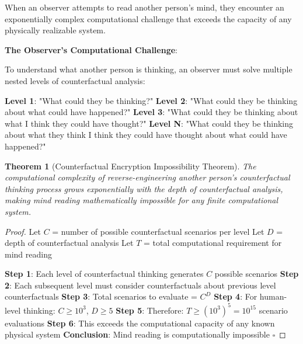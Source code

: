 \documentclass[12pt,a4paper]{article}
\newtheorem{theorem}{Theorem}[section]
\begin{document}
When an observer attempts to read another person's mind, they encounter an exponentially complex computational challenge that exceeds the capacity of any physically realizable system.

\textbf{The Observer's Computational Challenge}:

To understand what another person is thinking, an observer must solve multiple nested levels of counterfactual analysis:

\textbf{Level 1}: "What could they be thinking?"
\textbf{Level 2}: "What could they be thinking about what could have happened?"
\textbf{Level 3}: "What could they be thinking about what I think they could have thought?"
\textbf{Level N}: "What could they be thinking about what they think I think they could have thought about what could have happened?"

\begin{theorem}[Counterfactual Encryption Impossibility Theorem]
The computational complexity of reverse-engineering another person's counterfactual thinking process grows exponentially with the depth of counterfactual analysis, making mind reading mathematically impossible for any finite computational system.
\end{theorem}

\begin{proof}
Let $C$ = number of possible counterfactual scenarios per level
Let $D$ = depth of counterfactual analysis
Let $T$ = total computational requirement for mind reading

\textbf{Step 1}: Each level of counterfactual thinking generates $C$ possible scenarios
\textbf{Step 2}: Each subsequent level must consider counterfactuals about previous level counterfactuals
\textbf{Step 3}: Total scenarios to evaluate = $C^D$ 
\textbf{Step 4}: For human-level thinking: $C \geq 10^3$, $D \geq 5$
\textbf{Step 5}: Therefore: $T \geq (10^3)^5 = 10^{15}$ scenario evaluations
\textbf{Step 6}: This exceeds the computational capacity of any known physical system
\textbf{Conclusion}: Mind reading is computationally impossible $\square$
\end{proof}
\end{document}
